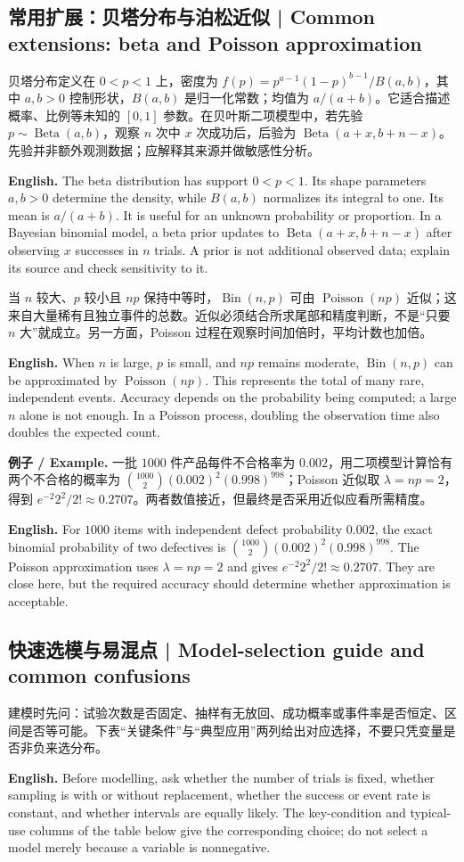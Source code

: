 \documentclass[UTF8,11pt,a4paper]{ctexart}
\newcommand{\EN}[1]{\par\noindent\textbf{English.} #1\par}
\newcommand{\EX}[2]{\par\noindent\textbf{例子 / Example.} #1\par\EN{#2}}
\begin{document}
\subsection{常用扩展：贝塔分布与泊松近似 | Common extensions: beta and Poisson approximation}
贝塔分布定义在 $0<p<1$ 上，密度为 $f(p)=p^{a-1}(1-p)^{b-1}/B(a,b)$，其中 $a,b>0$ 控制形状，$B(a,b)$ 是归一化常数；均值为 $a/(a+b)$。它适合描述概率、比例等未知的 $[0,1]$ 参数。在贝叶斯二项模型中，若先验 $p\sim\operatorname{Beta}(a,b)$，观察 $n$ 次中 $x$ 次成功后，后验为 $\operatorname{Beta}(a+x,b+n-x)$。先验并非额外观测数据；应解释其来源并做敏感性分析。
\EN{The beta distribution has support $0<p<1$. Its shape parameters $a,b>0$ determine the density, while $B(a,b)$ normalizes its integral to one. Its mean is $a/(a+b)$. It is useful for an unknown probability or proportion. In a Bayesian binomial model, a beta prior updates to $\operatorname{Beta}(a+x,b+n-x)$ after observing $x$ successes in $n$ trials. A prior is not additional observed data; explain its source and check sensitivity to it.}

当 $n$ 较大、$p$ 较小且 $np$ 保持中等时，$\operatorname{Bin}(n,p)$ 可由 $\operatorname{Poisson}(np)$ 近似；这来自大量稀有且独立事件的总数。近似必须结合所求尾部和精度判断，不是“只要 $n$ 大”就成立。另一方面，Poisson 过程在观察时间加倍时，平均计数也加倍。
\EN{When $n$ is large, $p$ is small, and $np$ remains moderate, $\operatorname{Bin}(n,p)$ can be approximated by $\operatorname{Poisson}(np)$. This represents the total of many rare, independent events. Accuracy depends on the probability being computed; a large $n$ alone is not enough. In a Poisson process, doubling the observation time also doubles the expected count.}

\EX{一批 $1000$ 件产品每件不合格率为 $0.002$，用二项模型计算恰有两个不合格的概率为 $\binom{1000}{2}(0.002)^2(0.998)^{998}$；Poisson 近似取 $\lambda=np=2$，得到 $e^{-2}2^2/2!\approx0.2707$。两者数值接近，但最终是否采用近似应看所需精度。}{For $1000$ items with independent defect probability $0.002$, the exact binomial probability of two defectives is $\binom{1000}{2}(0.002)^2(0.998)^{998}$. The Poisson approximation uses $\lambda=np=2$ and gives $e^{-2}2^2/2!\approx0.2707$. They are close here, but the required accuracy should determine whether approximation is acceptable.}

\subsection{快速选模与易混点 | Model-selection guide and common confusions}
\noindent 建模时先问：试验次数是否固定、抽样有无放回、成功概率或事件率是否恒定、区间是否等可能。下表“关键条件”与“典型应用”两列给出对应选择，不要只凭变量是否非负来选分布。
\EN{Before modelling, ask whether the number of trials is fixed, whether sampling is with or without replacement, whether the success or event rate is constant, and whether intervals are equally likely. The key-condition and typical-use columns of the table below give the corresponding choice; do not select a model merely because a variable is nonnegative.}
\end{document}
